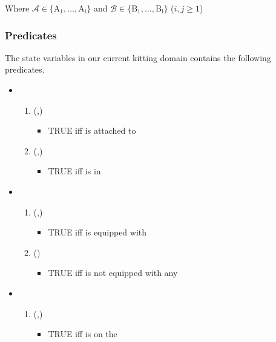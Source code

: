 Where $\mathcal{A} \in \mathrm{\{A_1,\ldots,A_i\}}$ and $\mathcal{B} \in \mathrm{\{B_1,\ldots,B_i\}}$ ($i, j\geq 1$)

\subsubsection{Predicates}



The state variables in our current kitting domain contains the following predicates.
\begin{itemize}
 \item {}
  \begin{enumerate}
  \item {}(,)
    \begin{itemize}
        \item TRUE iff  is attached to 
    \end{itemize}
  \item {}(,)
    \begin{itemize}
        \item TRUE iff  is in 
    \end{itemize}
  \end{enumerate}

 \item {}
    \begin{enumerate}[resume]
        \item {}(,)
        \begin{itemize}
            \item TRUE iff  is equipped with 
        \end{itemize}
  
        \item {}()
            \begin{itemize}
                \item TRUE iff  is not equipped with any 
             \end{itemize}  
  \end{enumerate}

 \item {}
  \begin{enumerate}[resume]
    \item {}(,)
        \begin{itemize}
            \item TRUE iff  is on the 
        \end{itemize}
  

\end{enumerate}
\end{itemize}
